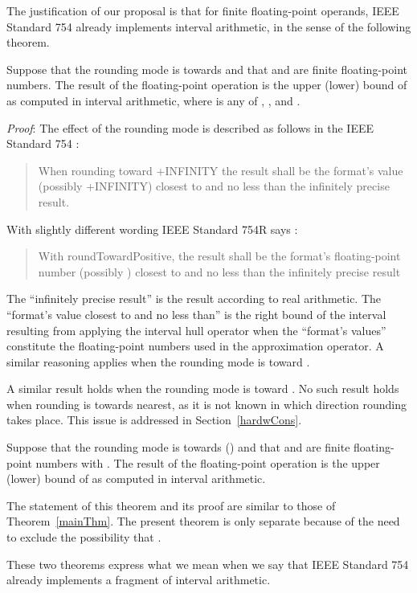 \documentclass[11pt]{article}
\begin{document}
The justification of our proposal is that for finite floating-point operands,
IEEE Standard 754 already implements interval arithmetic, in the sense of the
following theorem.
\begin{theorem}
\label{mainThm}
Suppose that the rounding mode is towards 
 and that  and  are finite floating-point numbers.
The result of the floating-point operation 
is the upper (lower) bound of 
as computed in interval arithmetic, where  is any of , ,
and .
\end{theorem}
\emph{Proof}:
The effect of the rounding mode is described as follows in the
IEEE Standard 754 \cite{Std754}:
\begin{quote}
When rounding toward +INFINITY the result shall be the format's value
(possibly +INFINITY) closest to and no less than the infinitely
precise result.
\end{quote}
With slightly different wording IEEE Standard 754R says \cite{Std754R}:
\begin{quote}
With  roundTowardPositive, the result shall be the format's
floating-point number (possibly ) closest to and no less than
the infinitely precise result
\end{quote}
The ``infinitely precise result'' is the result according to real
arithmetic. The ``format's value closest to and no less than'' is the
right bound of the interval resulting from applying the interval hull
operator when the ``format's values'' constitute the floating-point
numbers used in the approximation operator.  A similar reasoning
applies when the rounding mode is toward .  

A similar result holds when the rounding mode is toward .
No such result holds when rounding is towards nearest,
as it is not known in which direction rounding takes place.
This issue is addressed in Section~\ref{hardwCons}.

\begin{theorem}
\label{auxThm}
Suppose that the rounding mode is towards 
() and that  and  are finite floating-point numbers
with .
The result of the floating-point operation 
is the upper (lower) bound of 
as computed in interval arithmetic.
\end{theorem}

The statement of this theorem and its proof are similar to those of
Theorem~\ref{mainThm}. The present theorem is only separate because of
the need to exclude the possibility that .

These two theorems express what we mean when we say that IEEE Standard
754 already implements a fragment of interval arithmetic.
\end{document}
